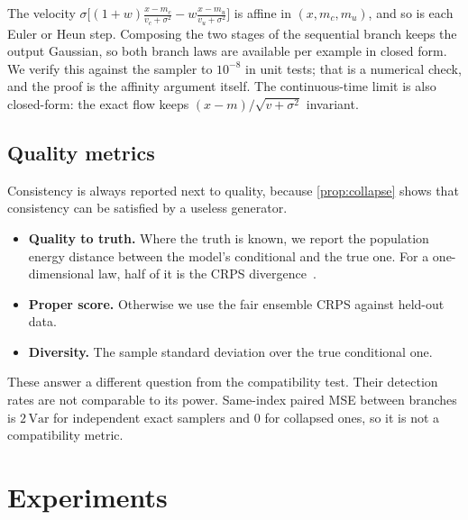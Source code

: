 \documentclass{article}
\theoremstyle{plain}
\theoremstyle{definition}
\theoremstyle{remark}
\begin{document}
The velocity $\sigma\big[(1+w)\frac{x-m_c}{v_c+\sigma^2}-w\frac{x-m_u}{v_u+\sigma^2}\big]$ is affine in $(x,m_c,m_u)$, and so is each Euler or Heun step.
Composing the two stages of the sequential branch keeps the output Gaussian, so both branch laws are available per example in closed form. We verify this against the sampler to $10^{-8}$ in unit tests; that is a numerical check, and the proof is the affinity argument itself.
The continuous-time limit is also closed-form: the exact flow keeps $(x-m)/\sqrt{v+\sigma^2}$ invariant.

\subsection{Quality metrics}
Consistency is always reported next to quality, because \cref{prop:collapse} shows that consistency can be satisfied by a useless generator.
\begin{itemize}
\item \textbf{Quality to truth.} Where the truth is known, we report the population energy distance between the model's conditional and the true one. For a one-dimensional law, half of it is the CRPS divergence~\citep{gneiting2007proper}.
\item \textbf{Proper score.} Otherwise we use the fair ensemble CRPS against held-out data.
\item \textbf{Diversity.} The sample standard deviation over the true conditional one.
\end{itemize}
These answer a different question from the compatibility test. Their detection rates are not comparable to its power.
Same-index paired MSE between branches is $2\,\mathrm{Var}$ for independent exact samplers and $0$ for collapsed ones, so it is not a compatibility metric.

\section{Experiments}
\label{sec:exp}
\end{document}
